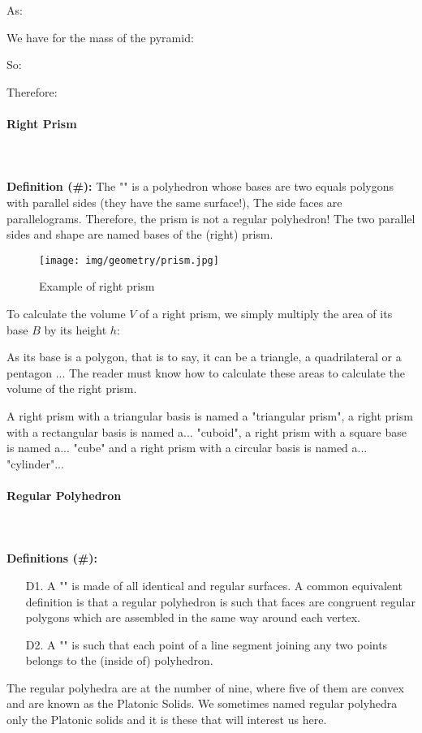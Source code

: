 {	As:
	
	We have for the mass of the pyramid:
	
	So:
	
	Therefore:
	
	
	\paragraph{Right Prism}\mbox{}\\\\
	\textbf{Definition (\#\mydef):} The "" is a polyhedron whose bases are two equals polygons with parallel sides (they have the same surface!), The side faces are parallelograms. Therefore, the prism is not a regular polyhedron! The two parallel sides and shape are named bases of the (right) prism.
	\begin{figure}[H]
		\centering
		\texttt{[image: img/geometry/prism.jpg]}
		\caption{Example of right prism}
	\end{figure}
	To calculate the volume $V$ of a right prism, we simply multiply the area of its base $B$ by its height $h$:
	
	As its base is a polygon, that is to say, it can be a triangle, a quadrilateral or a pentagon ... The reader must know how to calculate these areas to calculate the volume of the right prism.
	
	A right prism with a triangular basis is named a "triangular prism", a right prism with a rectangular basis is named a... "cuboid", a right prism with a square base is named a... "cube" and a right prism with a circular basis is named a... "cylinder"...
	
	\paragraph{Regular Polyhedron}\mbox{}\\\\
	\textbf{Definitions (\#\mydef):}
	\begin{enumerate}
		\item[D1.] A "" is made of all identical and regular surfaces. A common equivalent definition is that a regular polyhedron is such that faces are congruent regular polygons which are assembled in the same way around each vertex.
		
		\item[D2.] A "" is such that each point of a line segment joining any two points belongs to the (inside of) polyhedron.
	\end{enumerate}
	The regular polyhedra are at the number of nine, where five of them are convex and are known as the Platonic Solids. We sometimes named regular polyhedra only the Platonic solids and it is these that will interest us here.
	
}
